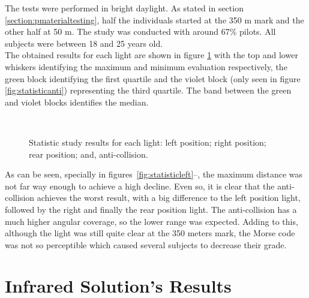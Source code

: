 The tests were performed in bright daylight. As stated in section \ref{section:pmaterialtesting}, half the individuals started at the 350 m mark and the other half at 50 m. The study was conducted with around 67\% pilots. All subjects were between 18 and 25 years old.\\
The obtained results for each light are shown in figure \ref{fig:statistic} with the top and lower whiskers identifying the maximum and minimum evaluation respectively, the green block identifying the first quartile and the violet block (only seen in figure \ref{fig:statisticanti}) representing the third quartile. The band between the green and violet blocks identifies the median. \\
\begin{figure}[!ht]
  \centering
  \hspace{8pt}
  \\
  \hspace{8pt}
  \caption[Statistic Study Results]{Statistic study results for each light:
			 left position;
			 right position;
			 rear position; and,
			 anti-collision.}%
  \label{fig:statistic}%
\end{figure}
As can be seen, specially in figures~\ref{fig:statisticleft}--, the maximum distance was not far way enough to achieve a high decline. Even so, it is clear that the anti-collision achieves the worst result, with a big difference to the left position light, followed by the right and finally the rear position light. The anti-collision has a much higher angular coverage, so the lower range was expected. Adding to this, although the light was still quite clear at the 350 meters mark, the Morse code was not so perceptible which caused several subjects to decrease their grade.\\

\section{Infrared Solution's Results}
\label{section:activeresults}

